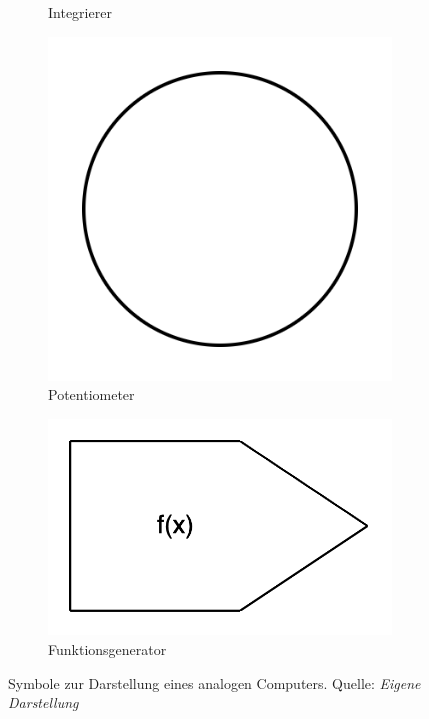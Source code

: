 \begin{figure}[h]
\begin{subfigure}[b]{0.2\textwidth}
    \caption{Integrierer}
  \end{subfigure}%
  \hfill
  \begin{subfigure}[b]{0.2\textwidth}
    \includegraphics[width=\textwidth]{abbildungen/symbol_potentiometer.png}
    \caption{Potentiometer}
  \end{subfigure}%
  \hfill
  \begin{subfigure}[b]{0.2\textwidth}
    \includegraphics[width=\textwidth]{abbildungen/symbol_funktionsgenerator.png}
    \caption{Funktionsgenerator}
  \end{subfigure}
  \caption{Symbole zur Darstellung eines analogen Computers. Quelle: \textit{Eigene Darstellung}}
  \label{fig:Symbole analoger Computer}
\end{figure}

